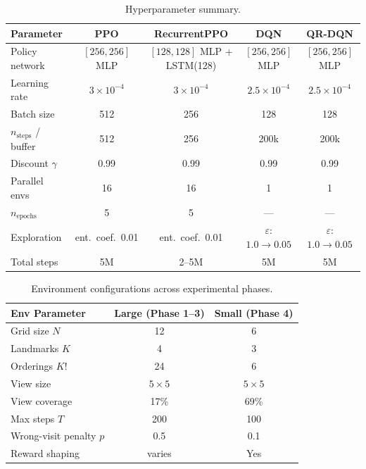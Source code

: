 \documentclass[11pt,a4paper]{article}
\begin{document}
\begin{table}[H]
\centering
\small
\begin{tabular}{lcccc}
\toprule
\textbf{Parameter} & \textbf{PPO} & \textbf{RecurrentPPO} & \textbf{DQN} & \textbf{QR-DQN} \\
\midrule
Policy network      & $[256,256]$ MLP & $[128,128]$ MLP + LSTM(128) & $[256,256]$ MLP & $[256,256]$ MLP \\
Learning rate       & $3\times10^{-4}$ & $3\times10^{-4}$ & $2.5\times10^{-4}$ & $2.5\times10^{-4}$ \\
Batch size          & 512             & 256             & 128             & 128 \\
$n_\text{steps}$ / buffer & 512       & 256             & 200k            & 200k \\
Discount $\gamma$   & 0.99            & 0.99            & 0.99            & 0.99 \\
Parallel envs       & 16              & 16              & 1               & 1 \\
$n_\text{epochs}$   & 5               & 5               & ---             & --- \\
Exploration         & ent.\ coef.\ 0.01 & ent.\ coef.\ 0.01 & $\varepsilon$: $1.0 \to 0.05$ & $\varepsilon$: $1.0 \to 0.05$ \\
Total steps         & 5M              & 2--5M           & 5M              & 5M \\
\bottomrule
\end{tabular}
\caption{Hyperparameter summary.}
\label{tab:hparams}
\end{table}

\begin{table}[H]
\centering
\begin{tabular}{lcc}
\toprule
\textbf{Env Parameter} & \textbf{Large (Phase 1--3)} & \textbf{Small (Phase 4)} \\
\midrule
Grid size $N$ & 12 & 6 \\
Landmarks $K$ & 4 & 3 \\
Orderings $K!$ & 24 & 6 \\
View size & $5\times5$ & $5\times5$ \\
View coverage & 17\% & 69\% \\
Max steps $T$ & 200 & 100 \\
Wrong-visit penalty $p$ & 0.5 & 0.1 \\
Reward shaping & varies & Yes \\
\bottomrule
\end{tabular}
\caption{Environment configurations across experimental phases.}
\label{tab:envparams}
\end{table}
\end{document}
